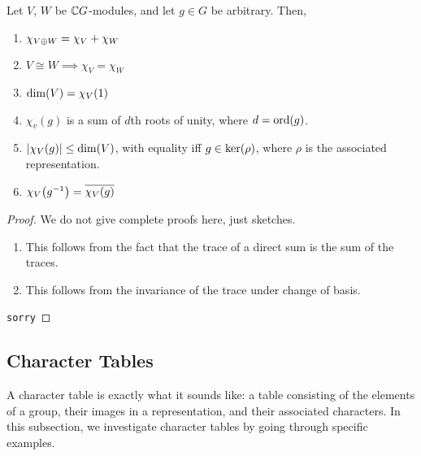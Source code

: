\begin{proposition}
    Let $V$, $W$ be $\mathbb{C} G$-modules, and let $g \in G$ be arbitrary. Then,
    \begin{enumerate}[label = \normalfont \arabic*., noitemsep]
        \item $\chi_{V \oplus W} = \chi_V + \chi_W$
        \item $V \cong W \implies \chi_V = \chi_W$
        \item $\dim\!\left( V \right) = \chi_V(1)$
        \item $\chi_v(g)$ is a sum of $d$th roots of unity, where $d = \operatorname{ord}\!\left( g \right)$.
        \item $\left\lvert \chi_V(g) \right\rvert \leq \dim\!\left( V \right)$, with equality iff $g \in \operatorname{ker}\!\left( \rho \right)$, where $\rho$ is the associated representation.
        \item $\chi_V\!\left( g^{-1} \right) = \overline{\chi_V(g)}$
    \end{enumerate}
\end{proposition}
\begin{proof}
    We do not give complete proofs here, just sketches.
    \begin{enumerate}
        \item This follows from the fact that the trace of a direct sum is the sum of the traces.
        \item This follows from the invariance of the trace under change of basis.
    \end{enumerate}
    \verb|sorry|
\end{proof}

\subsection{Character Tables}

A character table is exactly what it sounds like: a table consisting of the elements of a group, their images in a representation, and their associated characters. In this subsection, we investigate character tables by going through specific examples.

